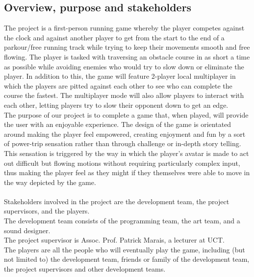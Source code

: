 \documentclass[a4paper,10pt]{article}
\begin{document}
\subsection{Overview, purpose and stakeholders}
The project is a first-person running game whereby the player competes against the clock and against another player to get from the start to the end of a parkour/free running track while trying to keep their movements smooth and free flowing. The player is tasked with traversing an obstacle course in as short a time as possible while avoiding enemies who would try to slow down or eliminate the player. In addition to this, the game will feature 2-player local multiplayer in which the players are pitted against each other to see who can complete the course the fastest. The multiplayer mode will also allow players to interact with each other, letting players try to slow their opponent down to get an edge. \\
The purpose of our project is to complete a game that, when played, will provide the user with an enjoyable experience. The design of the game is orientated around making the player feel empowered, creating enjoyment and fun by a sort of power-trip sensation rather than through challenge or in-depth story telling. This sensation is triggered by the way in which the player's avatar is made to act out difficult but flowing motions without requiring particularly complex input, thus making the player feel as they might if they themselves were able to move in the way depicted by the game.
\\ \\
Stakeholders involved in the project are the development team, the project supervisors, and the players. \\
The development team consists of the programming team, the art team, and a sound designer. \\
The project supervisor is Assoc. Prof. Patrick Marais, a lecturer at UCT. \\
The players are all the people who will eventually play the game, including (but not limited to) the development team, friends or family of the development team, the project supervisors and other development teams.
\end{document}
